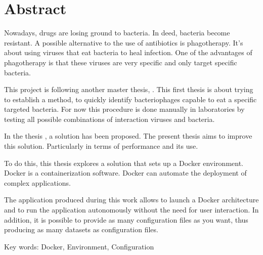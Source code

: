 

\cleardoublepage
\chapter*{Abstract}

Nowadays, drugs are losing ground to bacteria. In deed, bacteria become resistant. A possible alternative to the use of antibiotics is phagotherapy. It's about using viruses that eat bacteria to heal infection. One of the advantages of phagotherapy is that these viruses are very specific and only target specific bacteria.

This project is following another master thesis, \thLeite . This first thesis is about trying to establish a method, to quickly identify bacteriophages capable to eat a specific targeted bacteria. For now this procedure is done manually in laboratories by testing all possible combinations of interaction viruses and bacteria.

In the thesis \thLeite , a solution has been proposed. The present thesis aims to improve this solution. Particularly in terms of performance and its use.

To do this, this thesis explores a solution that sets up a Docker environment. Docker is a containerization software. Docker can automate the deployment of complex applications.

The application produced during this work allows to launch a Docker architecture and to run the application autonomously without the need for user interaction. In addition, it is possible to provide as many configuration files as you want, thus producing as many datasets as configuration files.

\vskip0.5cm
Key words: Docker, Environment, Configuration


